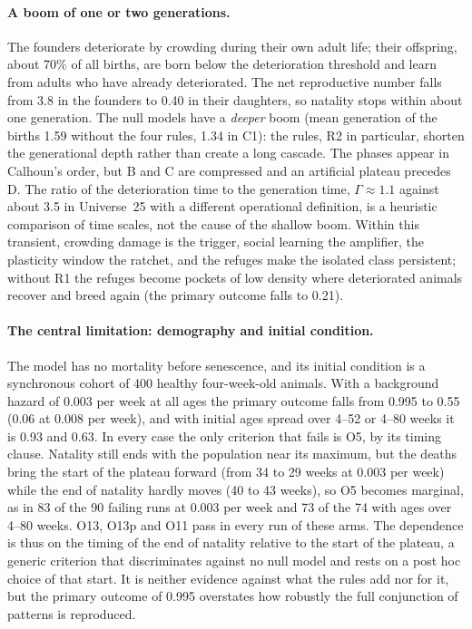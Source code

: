 \paragraph*{A boom of one or two generations.}
The founders deteriorate by crowding during their own adult life; their offspring, about 70\% of all births, are
born below the deterioration threshold and learn from adults who have already deteriorated. The net reproductive
number falls from 3.8 in the founders to 0.40 in their daughters, so natality stops within about one generation.
The null models have a \emph{deeper} boom (mean generation of the births 1.59 without the four rules, 1.34 in
\textsf{C1}): the rules, R2 in particular, shorten the generational depth rather than create a long cascade. The
phases appear in Calhoun's order, but B and C are compressed and an artificial plateau precedes D. The ratio of the
deterioration time to the generation time, $\Gamma\approx1.1$ against about 3.5 in Universe~25 with a different
operational definition, is a heuristic comparison of time scales, not the cause of the shallow boom. Within this
transient, crowding damage is the trigger, social learning the amplifier, the plasticity window the ratchet, and the
refuges make the isolated class persistent; without R1 the refuges become pockets of low density where deteriorated
animals recover and breed again (the primary outcome falls to 0.21).

\paragraph*{The central limitation: demography and initial condition.}
The model has no mortality before senescence, and its initial condition is a synchronous cohort of 400 healthy
four-week-old animals. With a background hazard of 0.003 per week at all ages the primary outcome falls from 0.995
to 0.55 (0.06 at 0.008 per week), and with initial ages spread over 4--52 or 4--80 weeks it is 0.93 and 0.63. In
every case the only criterion that fails is O5, by its timing clause. Natality still ends with the population near
its maximum, but the deaths bring the start of the plateau forward (from 34 to 29 weeks at 0.003 per week) while the
end of natality hardly moves (40 to 43 weeks), so O5 becomes marginal, as in 83 of the 90 failing runs at 0.003 per
week and 73 of the 74 with ages over 4--80 weeks. O13, O13p and O11 pass in every run of these arms. The dependence
is thus on the timing of the end of natality relative to the start of the plateau, a generic criterion that
discriminates against no null model and rests on a post hoc choice of that start. It is neither evidence against
what the rules add nor for it, but the primary outcome of 0.995 overstates how robustly the full conjunction of
patterns is reproduced.

